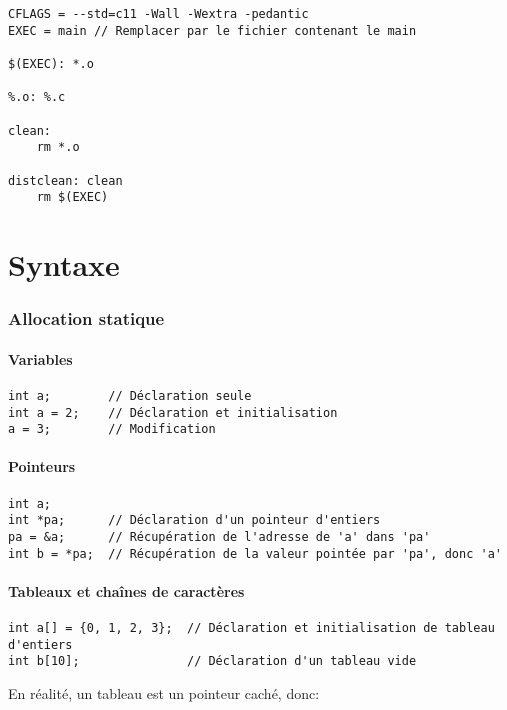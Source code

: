 \documentclass[10pt,a4paper,french]{article}
\begin{document}
\begin{verbatim}
CFLAGS = --std=c11 -Wall -Wextra -pedantic
EXEC = main // Remplacer par le fichier contenant le main

$(EXEC): *.o

%.o: %.c

clean:
	rm *.o

distclean: clean
	rm $(EXEC)
\end{verbatim}

\part{Syntaxe}

\section{Allocation statique}

\subsection{Variables}

\begin{verbatim}
int a;        // Déclaration seule
int a = 2;    // Déclaration et initialisation
a = 3;        // Modification
\end{verbatim}

\subsection{Pointeurs}

\begin{verbatim}
int a;
int *pa;      // Déclaration d'un pointeur d'entiers
pa = &a;      // Récupération de l'adresse de 'a' dans 'pa'
int b = *pa;  // Récupération de la valeur pointée par 'pa', donc 'a'
\end{verbatim}

\subsection{Tableaux et chaînes de caractères}

\begin{verbatim}
int a[] = {0, 1, 2, 3};  // Déclaration et initialisation de tableau d'entiers
int b[10];               // Déclaration d'un tableau vide
\end{verbatim}

En réalité, un tableau est un pointeur caché, donc:
\end{document}
